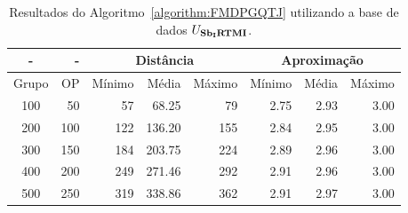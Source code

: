 \begin{table}[!htb]
  \caption{Resultados do Algoritmo~\ref{algorithm:FMDPGQTJ} utilizando a base de dados $U_{\textbf{Sb\textsubscript{I}RTMI}}{}$.}
  \label{table:EANTBRZP}
  \centering
  \begin{tabular}{|c|r|r|r|r|r|r|r|}
    \hline
      -      &  -   & \multicolumn{3}{c|}{Distância}             & \multicolumn{3}{c|}{Aproximação}           \\ \hline
    Grupo    & OP   & Mínimo       & Média        & Máximo       & Mínimo       & Média        & Máximo       \\ \hline  
    100      & 50   & 57           &  68.25       & 79           & 2.75         & 2.93         & 3.00         \\ \hline
    200      & 100  & 122          & 136.20       & 155          & 2.84         & 2.95         & 3.00         \\ \hline
    300      & 150  & 184          & 203.75       & 224          & 2.89         & 2.96         & 3.00         \\ \hline
    400      & 200  & 249          & 271.46       & 292          & 2.91         & 2.96         & 3.00         \\ \hline
    500      & 250  & 319          & 338.86       & 362          & 2.91         & 2.97         & 3.00         \\ \hline    
  \end{tabular}
\end{table}